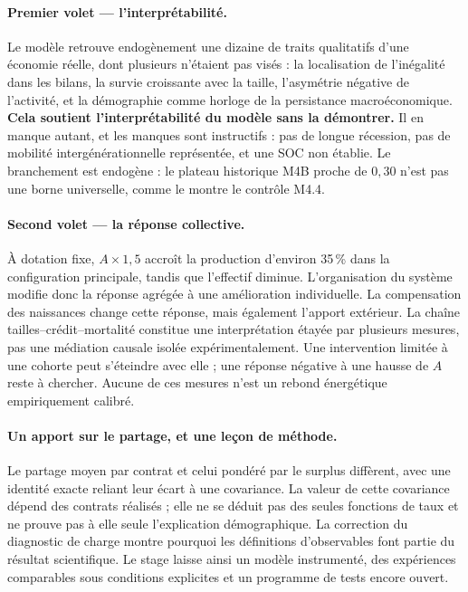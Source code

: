 \documentclass[11pt,a4paper]{article}
\begin{document}
\paragraph{Premier volet --- l'interprétabilité.} Le modèle retrouve
endogènement une dizaine de traits qualitatifs d'une économie réelle, dont
plusieurs n'étaient pas visés : la localisation de l'inégalité dans les bilans,
la survie croissante avec la taille, l'asymétrie négative de l'activité, et la
démographie comme horloge de la persistance macroéconomique. \textbf{Cela
soutient l'interprétabilité du modèle sans la démontrer.} Il en manque autant,
et les manques sont instructifs : pas de longue
récession, pas de mobilité intergénérationnelle représentée, et une SOC non
établie. Le branchement est endogène : le plateau historique M4B proche de
$0{,}30$ n'est pas une borne universelle, comme le montre le contrôle M4.4.

\paragraph{Second volet --- la réponse collective.}
À dotation fixe, $A\times1{,}5$ accroît la production d'environ 35\,\%
dans la configuration principale, tandis que l'effectif diminue.
L'organisation du système modifie donc la réponse agrégée à une amélioration
individuelle. La compensation des naissances change cette réponse, mais
également l'apport extérieur. La chaîne tailles--crédit--mortalité constitue
une interprétation étayée par plusieurs mesures, pas une médiation causale
isolée expérimentalement. Une intervention limitée à une cohorte peut
s'éteindre avec elle ; une réponse négative à une hausse de $A$ reste à
chercher. Aucune de ces mesures n'est un rebond énergétique empiriquement calibré.

\paragraph{Un apport sur le partage, et une leçon de méthode.}
Le partage moyen par contrat et celui pondéré par le surplus diffèrent,
avec une identité exacte reliant leur écart à une covariance.
La valeur de cette covariance dépend des contrats réalisés ; elle ne se
déduit pas des seules fonctions de taux et ne prouve pas à elle seule
l'explication démographique. La correction du diagnostic de charge montre
pourquoi les définitions d'observables font partie du résultat scientifique.
Le stage laisse ainsi un modèle instrumenté, des expériences comparables
sous conditions explicites et un programme de tests encore ouvert.
\end{document}
